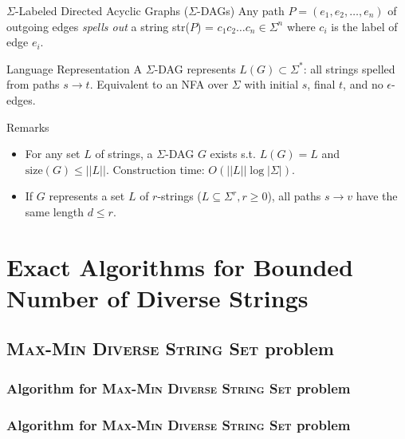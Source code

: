 \documentclass{beamer}
\begin{document}
\begin{frame}{$\Sigma$-Labeled Directed Acyclic Graphs ($\Sigma$-DAGs)}
    Any path $P = (e_1, e_2, \ldots, e_n)$ of outgoing edges \emph{spells out} a string str($P$) = $c_1c_2\ldots c_n \in \Sigma^n$ where $c_i$ is the label of edge $e_i$.

    \begin{block}{Language Representation}
        A $\Sigma$-DAG represents \( L(G) \subset \Sigma^* \): all strings spelled from paths \( s \to t \). Equivalent to an NFA over $\Sigma$ with initial \( s \), final \( t \), and no $\epsilon$-edges.
    \end{block}

    \begin{exampleblock}{Remarks}
        \begin{itemize}
            \item For any set \( L \) of strings, a $\Sigma$-DAG \( G \) exists s.t. \( L(G) = L \) and \( \text{size}(G) \leq ||L|| \). Construction time: \( O(||L|| \log |\Sigma|) \).
            \item If \( G \) represents a set \( L \) of \( r \)-strings ($L \subseteq \Sigma^r, r \geq 0$), all paths \( s \to v \) have the same length $d \leq r$.
        \end{itemize}
    \end{exampleblock}


\end{frame}

\section{Exact Algorithms for Bounded Number of Diverse Strings}
\subsection{\textsc{Max-Min Diverse String Set} problem}
\begin{frame}
    \frametitle{Algorithm for \textsc{Max-Min Diverse String Set} problem}



\end{frame}

\begin{frame}
    \frametitle{Algorithm for \textsc{Max-Min Diverse String Set} problem}



\end{frame}
\end{document}
